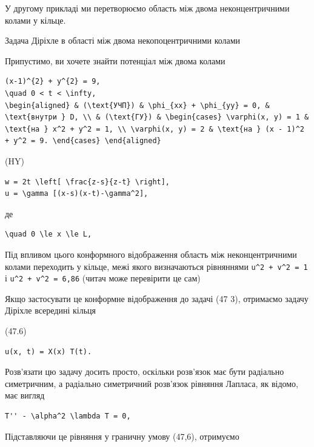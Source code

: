 \documentclass[
  ukrainian,
]{article}
\begin{document}
У другому прикладі ми перетворюємо область між двома неконцентричними
колами у кільце.

Задача Діріхле в області між двома некопоцентричними колами

Припустимо, ви хочете знайти потенціал між двома колами

\begin{verbatim}
(x-1)^{2} + y^{2} = 9,
\quad 0 < t < \infty,
\begin{aligned} & (\text{УЧП}) & \phi_{xx} + \phi_{yy} = 0, & \text{внутри } D, \\ & (\text{ГУ}) & \begin{cases} \varphi(x, y) = 1 & \text{на } x^2 + y^2 = 1, \\ \varphi(x, y) = 2 & \text{на } (x - 1)^2 + y^2 = 9. \end{cases} \end{aligned}
\end{verbatim}

(HY)

\begin{verbatim}
w = 2t \left[ \frac{z-s}{z-t} \right],
u = \gamma [(x-s)(x-t)-\gamma^2],
\end{verbatim}

де

\begin{verbatim}
\quad 0 \le x \le L,
\end{verbatim}

Під впливом цього конформного відображення область між неконцентричними
колами переходить у кільце, межі якого визначаються рівняннями
\texttt{u\^{}2\ +\ v\^{}2\ =\ 1} і \texttt{u\^{}2\ +\ v\^{}2\ =\ 6,86}
(читач може перевірити це сам)

Якщо застосувати це конформне відображення до задачі (47 3), отримаємо
задачу Діріхле всередині кільця

(47.6)

\begin{verbatim}
u(x, t) = X(x) T(t).
\end{verbatim}

Розв'язати цю задачу досить просто, оскільки розв'язок має бути
радіально симетричним, а радіально симетричний розв'язок рівняння
Лапласа, як відомо, має вигляд

\begin{verbatim}
T'' - \alpha^2 \lambda T = 0,
\end{verbatim}

Підставляючи це рівняння у граничну умову (47,6), отримуємо
\end{document}
